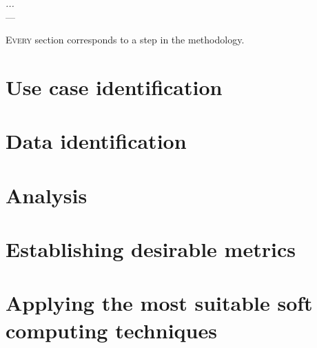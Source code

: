 \label{chap:urls}

\begin{flushright}{\slshape
  ...} \\ \medskip
    --- {}
\end{flushright}

\minitoc\mtcskip
\vfill

\lettrine{E}{very} section corresponds to a step in the methodology.


\section{Use case identification}


\section{Data identification}


\section{Analysis}


\section{Establishing desirable metrics}


\section{Applying the most suitable soft computing techniques}